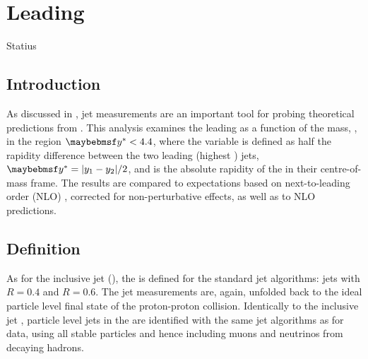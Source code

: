 \chapter{Leading \Dijet {}}
\label{chap:dijets}

{Statius}

\section{Introduction}
As discussed in , jet \xs measurements are an
important tool for probing theoretical predictions from \QCD. This analysis
examines the leading \dijet \xs as a function of the \dijet mass, \mDijet, in the region
$\yStar < 4.4$, where the variable \yStar is defined as half the rapidity difference
between the two leading (highest \pT) jets, $\yStar = |y_1 - y_2| / 2$, and is the
absolute rapidity of the  in their centre-of-mass frame. The results are
compared to expectations based on next-to-leading order (NLO) \QCD, corrected for
non-perturbative effects, as well as to NLO \MC predictions.

\section{\Xs Definition}
As for the inclusive jet \xs (),
the \dijet \xs is defined for the \ATLAS standard jet algorithms: \akt jets with
$R=0.4$ and $R =0.6$. The jet \xs measurements are, again, unfolded back to the
ideal particle level final state of the proton-proton collision. Identically to the
inclusive jet \xs, particle level jets in the \MC are identified with the same
jet algorithms as for data, using all stable particles and hence including muons
and neutrinos from decaying hadrons.

